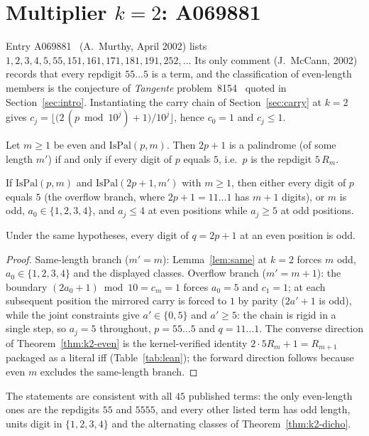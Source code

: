 \providecommand{\IsPal}{\mathrm{IsPal}}
\makeatletter
{}
\makeatother

\section{Multiplier $k = 2$: A069881}
\label{sec:k2}

Entry A069881~\cite{oeis} (A.~Murthy, April 2002) lists
$1, 2, 3, 4, 5, 55, 151, 161, 171, 181, 191, 252, \ldots$
Its only comment (J.~McCann, 2002) records that every
repdigit $55\ldots5$ is a term, and the classification
of even-length members is the conjecture of
\emph{Tangente} problem~8154~\cite{tangente} quoted in
Section~\ref{sec:intro}. Instantiating the carry chain
of Section~\ref{sec:carry} at $k = 2$ gives
$c_j = \bigl\lfloor\bigl(2\,(p \bmod 10^j) + 1\bigr)
/10^j\bigr\rfloor$, hence $c_0 = 1$ and $c_j \le 1$.

\begin{theorem}
\label{thm:k2-even}
Let $m \ge 1$ be even and $\IsPal(p,m)$. Then
$2p+1$ is a palindrome (of some length $m'$) if and
only if every digit of $p$ equals $5$, i.e.\ $p$ is the
repdigit $5\,R_m$.
\end{theorem}

\begin{theorem}
\label{thm:k2-dicho}
If $\IsPal(p,m)$ and $\IsPal(2p+1,m')$ with $m \ge 1$,
then either every digit of $p$ equals $5$ (the overflow
branch, where $2p+1 = 11\ldots1$ has $m+1$ digits), or
$m$ is odd, $a_0 \in \{1,2,3,4\}$, and $a_j \le 4$ at
even positions while $a_j \ge 5$ at odd positions.
\end{theorem}

\begin{corollary}
\label{cor:k2-img}
Under the same hypotheses, every digit of $q = 2p+1$ at
an even position is odd.
\end{corollary}

\begin{proof}
Same-length branch ($m' = m$):
Lemma~\ref{lem:same} at $k = 2$ forces $m$ odd,
$a_0 \in \{1,2,3,4\}$ and the displayed classes.
Overflow branch ($m' = m+1$): the boundary
$(2a_0 + 1) \bmod 10 = c_m = 1$ forces $a_0 = 5$ and
$c_1 = 1$; at each subsequent position the mirrored
carry is forced to $1$ by parity ($2a'+1$ is odd),
while the joint constraints give $a' \in \{0,5\}$ and
$a' \ge 5$: the chain is rigid in a single step, so
$a_j = 5$ throughout, $p = 55\ldots5$ and
$q = 11\ldots1$. The converse direction of
Theorem~\ref{thm:k2-even} is the kernel-verified
identity $2 \cdot 5R_m + 1 = R_{m+1}$ packaged as a
literal iff (Table~\ref{tab:lean}); the forward
direction follows because even $m$ excludes the
same-length branch.
\end{proof}

The statements are consistent with all $45$ published
terms: the only even-length ones are the repdigits $55$
and $5555$, and every other listed term has odd length,
units digit in $\{1,2,3,4\}$ and the alternating classes
of Theorem~\ref{thm:k2-dicho}.
